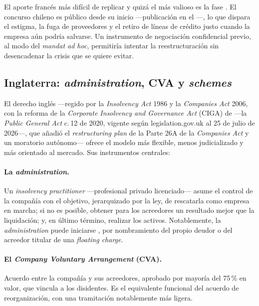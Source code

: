 \begin{foco}
El aporte francés más difícil de replicar y quizá el más valioso es la fase
. El concurso chileno es público desde su inicio ---publicación
en el \boletin{}---, lo que dispara el estigma, la fuga de proveedores y el retiro de líneas de
crédito justo cuando la empresa aún podría salvarse. Un instrumento de negociación confidencial
previo, al modo del \emph{mandat ad hoc}, permitiría intentar la reestructuración sin desencadenar
la crisis que se quiere evitar.
\end{foco}

\subsection{Inglaterra: \emph{administration}, CVA y \emph{schemes}}

El derecho inglés ---regido por la \emph{Insolvency Act} 1986 y la \emph{Companies Act} 2006, con la
reforma de la \emph{Corporate Insolvency and Governance Act} (CIGA) de  ---la
\emph{Public General Act} c.\,12 de 2020, vigente según legislation.gov.uk al 25 de julio de
2026---, que añadió el \emph{restructuring plan} de la Parte 26A de la \emph{Companies Act} y un
moratorio autónomo--- ofrece el modelo más flexible, menos judicializado y más orientado al
mercado. Sus instrumentos centrales:

\paragraph{La \emph{administration}.} Un \emph{insolvency practitioner} ---profesional privado
licenciado--- asume el control de la compañía con el objetivo, jerarquizado por la ley, de rescatarla
como empresa en marcha; si no es posible, obtener para los acreedores un resultado mejor que la
liquidación; y, en último término, realizar los activos. Notablemente, la \emph{administration} puede
iniciarse , por nombramiento del propio deudor o del acreedor
titular de una \emph{floating charge}.

\paragraph{El \emph{Company Voluntary Arrangement} (CVA).} Acuerdo entre la compañía y sus
acreedores, aprobado por mayoría del 75\,\% en valor, que vincula a los disidentes. Es el equivalente
funcional del acuerdo de reorganización, con una tramitación notablemente más ligera.

